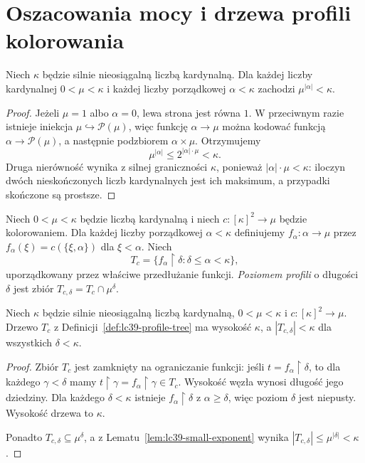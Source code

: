 \section{Oszacowania mocy i drzewa profili kolorowania}

\begin{lemat}
\label{lem:lc39-small-exponent}
Niech $\kappa$ będzie silnie nieosiągalną
liczbą kardynalną. Dla każdej liczby
kardynalnej $0<\mu<\kappa$ i każdej
liczby porządkowej $\alpha<\kappa$
zachodzi $\mu^{|\alpha|}<\kappa$.
\end{lemat}
\begin{proof}
Jeżeli $\mu=1$ albo $\alpha=0$,
lewa strona jest równa $1$.
W przeciwnym razie istnieje iniekcja
$\mu\hookrightarrow\mathcal P(\mu)$,
więc funkcję $\alpha\to\mu$ można
kodować funkcją
$\alpha\to\mathcal P(\mu)$,
a następnie podzbiorem $\alpha\times\mu$.
Otrzymujemy
\[
 \mu^{|\alpha|}
 \le 2^{|\alpha|\cdot\mu}<\kappa.
\]
Druga nierówność wynika z silnej
graniczności $\kappa$, ponieważ
$|\alpha|\cdot\mu<\kappa$:
iloczyn dwóch nieskończonych liczb
kardynalnych jest ich maksimum,
a przypadki skończone są prostsze.
\end{proof}

\begin{definicja}
\label{def:lc39-profile-tree}
Niech $0<\mu<\kappa$ będzie liczbą
kardynalną i niech
$c:[\kappa]^2\to\mu$ będzie kolorowaniem.
Dla każdej liczby porządkowej
$\alpha<\kappa$ definiujemy
$f_\alpha:\alpha\to\mu$ przez
$f_\alpha(\xi)=c(\{\xi,\alpha\})$
dla $\xi<\alpha$.
Niech
\[
 T_c=\{f_\alpha\restriction\delta:
                   \delta\le\alpha<\kappa\},
\]
uporządkowany przez właściwe
przedłużanie funkcji.
\emph{Poziomem profili} o długości
$\delta$ jest zbiór
$T_{c,\delta}=T_c\cap\mu^\delta$.
\end{definicja}

\begin{lemat}
\label{lem:lc39-profile-kappa-tree}
Niech $\kappa$ będzie silnie nieosiągalną
liczbą kardynalną, $0<\mu<\kappa$
i $c:[\kappa]^2\to\mu$.
Drzewo $T_c$ z
Definicji~\ref{def:lc39-profile-tree}
ma wysokość $\kappa$, a
$|T_{c,\delta}|<\kappa$
dla wszystkich $\delta<\kappa$.
\end{lemat}
\begin{proof}
Zbiór $T_c$ jest zamknięty na
ograniczanie funkcji: jeśli
$t=f_\alpha\restriction\delta$,
to dla każdego $\gamma<\delta$
mamy
$t\restriction\gamma
 =f_\alpha\restriction\gamma\in T_c$.
Wysokość węzła wynosi długość
jego dziedziny. Dla każdego
$\delta<\kappa$ istnieje
$f_\alpha\restriction\delta$
z $\alpha\ge\delta$, więc
poziom $\delta$ jest niepusty.
Wysokość drzewa to $\kappa$.

Ponadto
$T_{c,\delta}\subseteq\mu^\delta$,
a z Lematu~\ref{lem:lc39-small-exponent}
wynika
$|T_{c,\delta}|
 \le\mu^{|\delta|}<\kappa$.
\end{proof}

